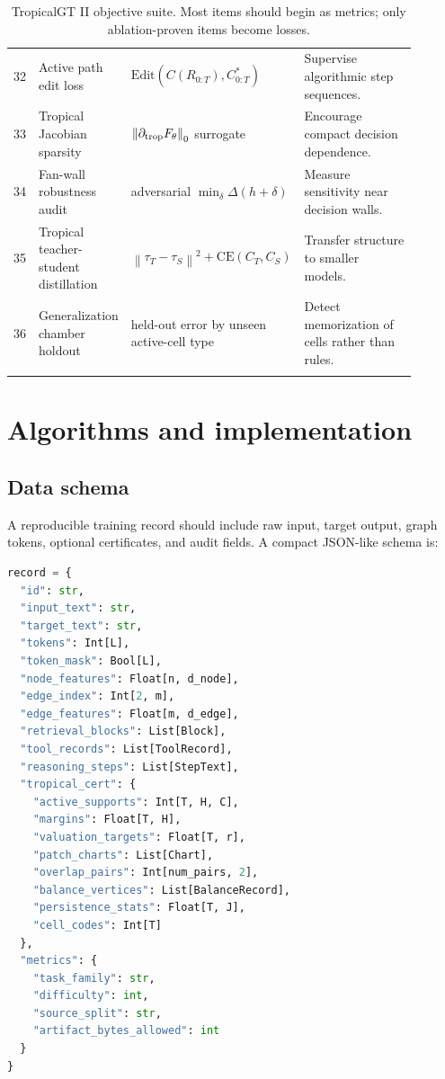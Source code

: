 \documentclass[11pt]{article}
\newcommand{\norm}[1]{\left\lVert #1\right\rVert}
\begin{document}
\begin{longtable}{p{0.05\linewidth}p{0.22\linewidth}p{0.34\linewidth}p{0.28\linewidth}}
32 & Active path edit loss & \(\mathrm{Edit}(C(R_{0:T}),C^*_{0:T})\) & Supervise algorithmic step sequences. \\
33 & Tropical Jacobian sparsity & \(\norm{\partial_{\rm trop}F_\theta}_0\) surrogate & Encourage compact decision dependence. \\
34 & Fan-wall robustness audit & adversarial \(\min_{\delta}\Delta(h+\delta)\) & Measure sensitivity near decision walls. \\
35 & Tropical teacher-student distillation & \(\norm{\tau_T-\tau_S}^2+\mathrm{CE}(C_T,C_S)\) & Transfer structure to smaller models. \\
36 & Generalization chamber holdout & held-out error by unseen active-cell type & Detect memorization of cells rather than rules. \\
\bottomrule
\caption{TropicalGT II objective suite.  Most items should begin as metrics; only ablation-proven items become losses.}
\end{longtable}

\section{Algorithms and implementation}\label{sec:implementation}

\subsection{Data schema}

A reproducible training record should include raw input, target output, graph tokens, optional certificates, and audit fields.  A compact JSON-like schema is:

\begin{lstlisting}[language=Python,caption={TropicalGT II training record schema.}]
record = {
  "id": str,
  "input_text": str,
  "target_text": str,
  "tokens": Int[L],
  "token_mask": Bool[L],
  "node_features": Float[n, d_node],
  "edge_index": Int[2, m],
  "edge_features": Float[m, d_edge],
  "retrieval_blocks": List[Block],
  "tool_records": List[ToolRecord],
  "reasoning_steps": List[StepText],
  "tropical_cert": {
    "active_supports": Int[T, H, C],
    "margins": Float[T, H],
    "valuation_targets": Float[T, r],
    "patch_charts": List[Chart],
    "overlap_pairs": Int[num_pairs, 2],
    "balance_vertices": List[BalanceRecord],
    "persistence_stats": Float[T, J],
    "cell_codes": Int[T]
  },
  "metrics": {
    "task_family": str,
    "difficulty": int,
    "source_split": str,
    "artifact_bytes_allowed": int
  }
}
\end{lstlisting}
\end{document}
